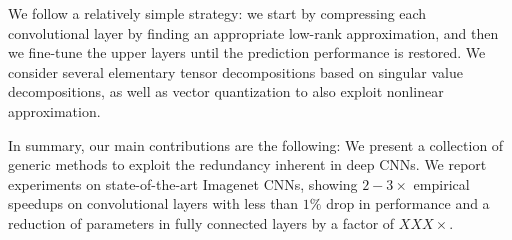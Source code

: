 We follow a relatively simple strategy: we start by compressing each 
convolutional layer by finding an appropriate low-rank approximation, 
and then we fine-tune the upper layers until the prediction performance 
is restored. We consider several elementary tensor decompositions based 
on singular value decompositions, as well as vector quantization to 
also exploit nonlinear approximation. 

In summary, our main contributions are the following:
We present a collection of generic methods to exploit the redundancy inherent in deep CNNs.
We report experiments on state-of-the-art Imagenet CNNs, showing $2-3\times$ empirical speedups on 
convolutional layers with less than $1\%$ drop in performance and a reduction of parameters in fully connected layers by a factor of $XXX\times$.





